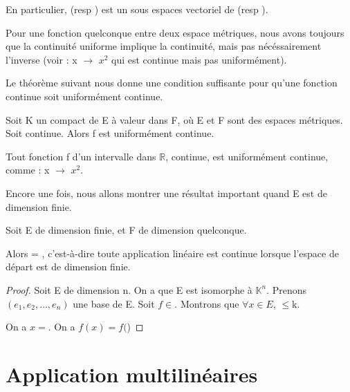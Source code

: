 En particulier,  (resp ) est un sous
espaces vectoriel de  (resp ).

\begin{remarque}
	Pour une fonction quelconque entre deux espace métriques, nous avons
	toujours que la continuité uniforme implique la continuité, mais pas
	nécéssairement l'inverse (voir  : x $\rightarrow$ $x^2$ qui est continue mais pas uniformément).
\end{remarque}

Le théorème suivant nous donne une condition suffisante pour qu'une fonction
continue soit uniformément continue.

\begin{theorem} [Heine]
	Soit K un compact de E à valeur dans F, où E et F sont des espaces
	métriques. Soit  continue. Alors f est uniformément
	continue.
	\label{Heine}
\end{theorem}

\begin{exemple}
	Tout fonction f d'un intervalle  dans $\mathbb{R}$, continue, est
	uniformément continue, comme
	 : x $\rightarrow$ $x^2$.
\end{exemple}

Encore une fois, nous allons montrer une résultat important quand E est de
dimension finie.

\begin{proposition}
	Soit E de dimension finie, et F de dimension quelconque.
	
	Alors  = , c'est-à-dire toute
	application linéaire est continue lorsque l'espace de départ est de
	dimension finie.
\end{proposition}

\begin{proof}
	Soit E de dimension n.
	On a que E est isomorphe à $\mathbb{K}^{n}$. Prenons $(e_{1}, e_{2}, \ldots,
	e_{n})$ une base de E.
	Soit $f \in $. Montrons que $\forall x \in E$,
	$ \leq $k.

	On a $x = $.
	On a $f(x) = f($)
\end{proof}
\section{Application multilinéaires}

